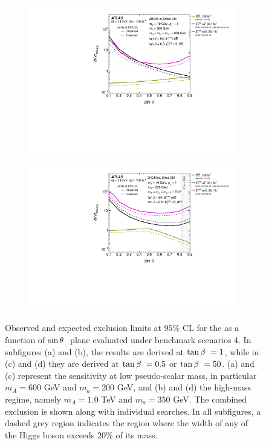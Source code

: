 \begin{figure}[h!]
\begin{subfigure}[2]{0.495\textwidth}
        \includegraphics[width=\linewidth]{figures/fig_07c.pdf}
        \caption{}
        \label{fig:result-sint-scan-c}
    \end{subfigure}
    \begin{subfigure}[2]{0.495\textwidth}
        \centering
        \includegraphics[width=\linewidth]{figures/fig_07d.pdf}
        \caption{}
        \label{fig:result-sint-scan-d}
    \end{subfigure}
    \caption{Observed and expected exclusion limits at $95\%$ CL for the \thdma as a function of $\sin\theta~$ plane evaluated under benchmark scenarios 4. In subfigures (a) and (b), the results are derived at $\tan\beta~=1$, while in (c) and (d) they are derived at $\tan\beta~=0.5$ or $\tan\beta~=50$. (a) and (c) represent the sensitivity at low pseudo-scalar mass, in particular $m_A=600$ GeV and $m_a=200$ GeV, and (b) and (d) the high-mass regime, namely $m_A=1.0$ TeV and $m_a=350$ GeV. The combined exclusion is shown along with individual searches. In all subfigures, a dashed grey region indicates the region where the width of any of the Higgs boson exceeds $20\%$ of its mass. }
    \label{fig:result-sint-scan}
\end{figure} 

